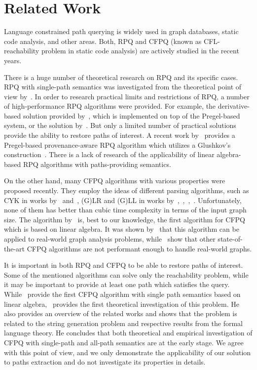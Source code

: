 \section{Related Work}

Language constrained path querying is widely used in graph databases, static code analysis, and other areas.
Both, RPQ and CFPQ (known as CFL-reachability problem in static code analysis) are actively studied in the recent years.

There is a huge number of theoretical research on RPQ and its specific cases.
RPQ with single-path semantics was investigated from the theoretical point of view by~\cite{barrett2000formal}.
In order to research practical limits and restrictions of RPQ, a number of high-performance RPQ algorithms were provided.
For example, the derivative-based solution provided by~\cite{10.1145/2949689.2949711}, which is implemented on top of the Pregel-based system, or the solution by~\cite{10.1007/978-3-642-31235-9_12}.
But only a limited number of practical solutions provide the ability to restore paths of interest.
A recent work by~\cite{Wang2019} provides a Pregel-based provenance-aware RPQ algorithm which utilizes a Glushkov's construction~\citep{Glushkov1961}.
There is a lack of research of the applicability of linear algebra-based RPQ algorithms with paths-providing semantics.

On the other hand, many CFPQ algorithms with various properties were proposed recently.
They employ the ideas of different parsing algorithms, such as CYK in works by~\cite{hellingsRelational} and~\cite{8249039}, (G)LR and (G)LL in works by~\cite{Grigorev:2017:CPQ:3166094.3166104},~\cite{Medeiros:2018:EEC:3167132.3167265},~\cite{10.1007/978-3-319-91662-0_17},~\cite{10.1007/978-3-319-41579-6_22}.
Unfortunately, none of them has better than cubic time complexity in terms of the input graph size.
The algorithm by~\cite{Azimov:2018:CPQ:3210259.3210264} is, best to our knowledge, the first algorithm for CFPQ which is based on linear algebra.
It was shown by~\cite{10.1145/3398682.3399163} that this algorithm can be applied to real-world graph analysis problems, while~\cite{Kuijpers:2019:ESC:3335783.3335791} show that other state-of-the-art CFPQ algorithms are not performant enough to handle real-world graphs.

It is important in both RPQ and CFPQ to be able to restore paths of interest.
Some of the mentioned algorithms can solve only the reachability problem, while it may be important to provide at least one path which satisfies the query.
While~\cite{10.1145/3398682.3399163} provide the first CFPQ algorithm with single path semantics based on linear algebra,~\cite{HellSinglePath} provides the first theoretical investigation of this problem.
He also provides an overview of the related works and shows that the problem is related to the string generation problem and respective results from the formal language theory.
He concludes that both theoretical and empirical investigation of CFPQ with single-path and all-path semantics are at the early stage.
We agree with this point of view, and we only demonstrate the applicability of our solution to paths extraction and do not investigate its properties in details.

